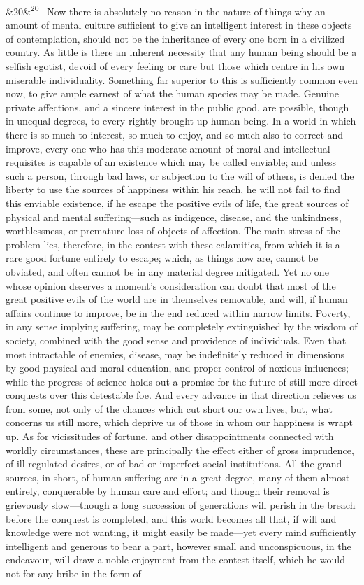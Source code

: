 \documentclass[12pt]{article}
\newcommand{\para}[1][]{\par\noindent\ifx&#1&\else\textsuperscript{\footnotesize #1}~\fi}
\begin{document}
\para[20] Now there is absolutely no reason in the nature of things why an amount of mental culture sufficient to give an intelligent interest in these objects of contemplation, should not be the inheritance of every one born in a civilized country. As little is there an inherent necessity that any human being should be a selfish egotist, devoid of every feeling or care but those which centre in his own miserable individuality. Something far superior to this is sufficiently common even now, to give ample earnest of what the human species may be made. Genuine private affections, and a sincere interest in the public good, are possible, though in unequal degrees, to every rightly brought-up human being. In a world in which there is so much to interest, so much to enjoy, and so much also to correct and improve, every one who has this moderate amount of moral and intellectual requisites is capable of an existence which may be called enviable; and unless such a person, through bad laws, or subjection to the will of others, is denied the liberty to use the sources of happiness within his reach, he will not fail to find this enviable existence, if he escape the positive evils of life, the great sources of physical and mental suffering---such as indigence, disease, and the unkindness, worthlessness, or premature loss of objects of affection. The main stress of the problem lies, therefore, in the contest with these calamities, from which it is a rare good fortune entirely to escape; which, as things now are, cannot be obviated, and often cannot be in any material degree mitigated. Yet no one whose opinion deserves a moment's consideration can doubt that most of the great positive evils of the world are in themselves removable, and will, if human affairs continue to improve, be in the end reduced within narrow limits. Poverty, in any sense implying suffering, may be completely extinguished by the wisdom of society, combined with the good sense and providence of individuals. Even that most intractable of enemies, disease, may be indefinitely reduced in dimensions by good physical and moral education, and proper control of noxious influences; while the progress of science holds out a promise for the future of still more direct conquests over this detestable foe. And every advance in that direction relieves us from some, not only of the chances which cut short our own lives, but, what concerns us still more, which deprive us of those in whom our happiness is wrapt up. As for vicissitudes of fortune, and other disappointments connected with worldly circumstances, these are principally the effect either of gross imprudence, of ill-regulated desires, or of bad or imperfect social institutions. All the grand sources, in short, of human suffering are in a great degree, many of them almost entirely, conquerable by human care and effort; and though their removal is grievously slow---though a long succession of generations will perish in the breach before the conquest is completed, and this world becomes all that, if will and knowledge were not wanting, it might easily be made---yet every mind sufficiently intelligent and generous to bear a part, however small and unconspicuous, in the endeavour, will draw a noble enjoyment from the contest itself, which he would not for any bribe in the form of 
\end{document}
